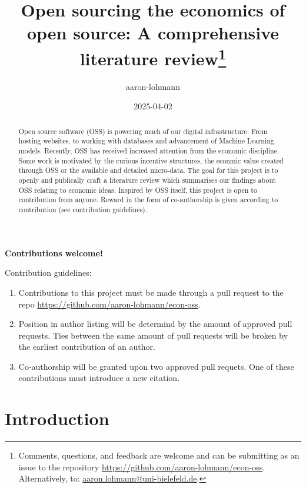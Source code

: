 \documentclass[
  12pt,
]{article}
\title{Open sourcing the economics of open source: A comprehensive
literature review\thanks{Comments, questions, and feedback are welcome
and can be submitting as an issue to the repository
\href{https://github.com/aaron-lohmann/econ-oss/issues}{https://github.com/aaron-lohmann/econ-oss}.
Alternatively, to:
\href{aaron.lohmann@uni-bielefeld.de}{aaron.lohmann@uni-bielefeld.de}.}}
\author{aaron-lohmann}
\date{2025-04-02}
\providecommand{\tightlist}{%
  \setlength{\itemsep}{0pt}\setlength{\parskip}{0pt}}\usepackage{longtable,booktabs,array}
\begin{document}
\maketitle
\begin{abstract}
Open source software (OSS) is powering much of our digital
infrastructure. From hosting websites, to working with databases and
advancement of Machine Learning models. Recently, OSS has received
increased attention from the economic discipline. Some work is motivated
by the curious incentive structures, the econmic value created through
OSS or the available and detailed micro-data. The goal for this project
is to openly and publically craft a literature review which summarises
our findings about OSS relating to economic ideas. Inspired by OSS
itself, this project is open to contribution from anyone. Reward in the
form of co-authorship is given according to contribution (see
contribution guidelines).
\end{abstract}

\begin{center}
\bf{Contributions welcome!}
\end{center}

Contribution guidelines:

\begin{enumerate}
\def\labelenumi{\arabic{enumi}.}
\tightlist
\item
  Contributions to this project must be made through a pull request to
  the repo \url{https://github.com/aaron-lohmann/econ-oss}.
\item
  Position in author listing will be determind by the amount of approved
  pull requests. Ties between the same amount of pull requests will be
  broken by the earliest contribution of an author.
\item
  Co-authorship will be granted upon two approved pull requets. One of
  these contributions must introduce a new citation.
\end{enumerate}

\newpage

\section{Introduction}\label{sec-introduction}
\end{document}
